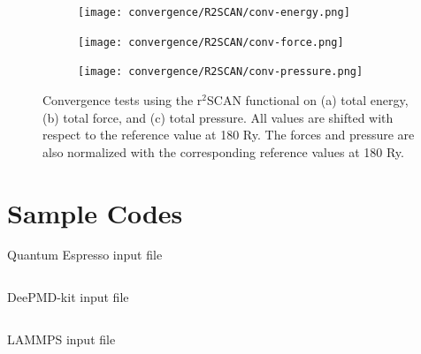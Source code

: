 \begin{figure}[!tbhp]
    \centering
    \begin{subfigure}{0.32\textwidth}
        \centering
        \texttt{[image: convergence/R2SCAN/conv-energy.png]}
        \caption{}
    \end{subfigure}
    \hfill
    \begin{subfigure}{0.32\textwidth}
        \centering
        \texttt{[image: convergence/R2SCAN/conv-force.png]}
        \caption{}
    \end{subfigure}
    \hfill
    \begin{subfigure}{0.32\textwidth}
        \centering

        \texttt{[image: convergence/R2SCAN/conv-pressure.png]}
        \caption{}
    \end{subfigure}
    \caption{Convergence tests using the r$^2$SCAN functional on (a) total
        energy,
        (b) total force, and (c) total pressure.  All values are shifted
        with respect to the reference value at 180 Ry. The forces and pressure
        are also normalized with the corresponding reference values at 180 Ry.}
    \label{fig:conv_r2scan}
\end{figure}

\clearpage

\section*{Sample Codes}
\begin{listing}[!ht]
    \caption{Quantum Espresso input file}
    \inputminted[linenos,frame=leftline,fontsize=\footnotesize,
        breakanywhere,breaklines
    ]{fortran}{./codes/h2o.scf_130.in}
\end{listing}

\begin{listing}[!ht]
    \caption{DeePMD-kit input file}
    \inputminted[linenos,frame=leftline,fontsize=\footnotesize,
        breakanywhere,breaklines
    ]{json}{./codes/input.json}
\end{listing}

\begin{listing}[!ht ]
    \caption{LAMMPS input file}
    \inputminted[linenos,frame=leftline,fontsize=\footnotesize,
        breakanywhere,breaklines
    ]{bash}{./codes/in.lammps}
\end{listing}